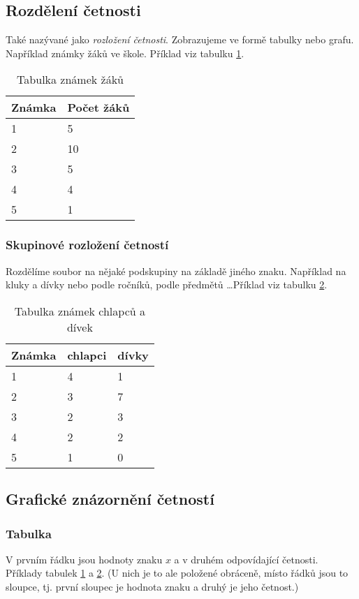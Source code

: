 \documentclass[12pt]{article}
\begin{document}
\subsection{Rozdělení četnosti}
Také nazývané jako \emph{rozložení četnosti}. Zobrazujeme ve formě tabulky nebo grafu.  Například známky žáků ve škole. Příklad viz tabulku \ref{table:zaci}.
\begin{table}[h!]
\centering
\begin{tabular}{|l|l|}
\hline
Známka & Počet žáků \\ \hline
1      & 5          \\ \hline
2      & 10         \\ \hline
3      & 5          \\ \hline
4      & 4          \\ \hline
5      & 1          \\ \hline
\end{tabular}
\caption{Tabulka známek žáků}
\label{table:zaci}
\end{table}
\subsubsection{Skupinové rozložení četností}
Rozdělíme soubor na nějaké podskupiny na základě jiného znaku. Například na kluky a dívky nebo podle ročníků, podle předmětů \dots Příklad viz tabulku \ref{table:zaci_pohlavi}.
\begin{table}[H]
\centering
\begin{tabular}{|l|l|l|}
\hline
Známka & chlapci & dívky \\ \hline
1      & 4       & 1     \\ \hline
2      & 3       & 7     \\ \hline
3      & 2       & 3     \\ \hline
4      & 2       & 2     \\ \hline
5      & 1       & 0     \\ \hline
\end{tabular}
\caption{Tabulka známek chlapců a dívek}
\label{table:zaci_pohlavi}
\end{table}
\subsection{Grafické znázornění četností}
\subsubsection{Tabulka}
V prvním řádku jsou hodnoty znaku $x$ a v druhém odpovídající četnosti. Příklady tabulek \ref{table:zaci} a \ref{table:zaci_pohlavi}. (U nich je to ale položené obráceně, místo řádků jsou to sloupce, tj. první sloupec je hodnota znaku a druhý je jeho četnost.)
\end{document}
